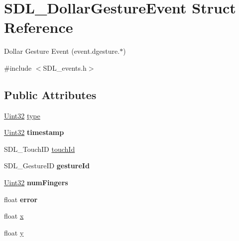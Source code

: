 \hypertarget{struct_s_d_l___dollar_gesture_event}{}\section{S\+D\+L\+\_\+\+Dollar\+Gesture\+Event Struct Reference}
\label{struct_s_d_l___dollar_gesture_event}


Dollar Gesture Event (event.\+dgesture.$\ast$)  




{\ttfamily \#include $<$S\+D\+L\+\_\+events.\+h$>$}

\subsection*{Public Attributes}
\begin{DoxyCompactItemize}
\item 
\hyperlink{_s_d_l__stdinc_8h_add440eff171ea5f55cb00c4a9ab8672d}{Uint32} \hyperlink{struct_s_d_l___dollar_gesture_event_ac7f6948754a1b2eb36edde043bf75ce9}{type}
\item 
\mbox{\label{struct_s_d_l___dollar_gesture_event_a3bccd8ebdf30b79c0f4074f6471ec583}} 
\hyperlink{_s_d_l__stdinc_8h_add440eff171ea5f55cb00c4a9ab8672d}{Uint32} {\bfseries timestamp}
\item 
S\+D\+L\+\_\+\+Touch\+ID \hyperlink{struct_s_d_l___dollar_gesture_event_a40402f6911ed0dba48e6b23aa02bd83d}{touch\+Id}
\item 
\mbox{\label{struct_s_d_l___dollar_gesture_event_a68968438eae9e58208b14e8c954dec31}} 
S\+D\+L\+\_\+\+Gesture\+ID {\bfseries gesture\+Id}
\item 
\mbox{\label{struct_s_d_l___dollar_gesture_event_a14160d8bad8569f53dd18ed8f64d253f}} 
\hyperlink{_s_d_l__stdinc_8h_add440eff171ea5f55cb00c4a9ab8672d}{Uint32} {\bfseries num\+Fingers}
\item 
\mbox{\label{struct_s_d_l___dollar_gesture_event_a30aaa8fe0df93615e6692aa20e9c13eb}} 
float {\bfseries error}
\item 
float \hyperlink{struct_s_d_l___dollar_gesture_event_a9888449bd8842ed96494b4db16a6097b}{x}
\item 
float \hyperlink{struct_s_d_l___dollar_gesture_event_a293b2303acc1cfc63c167c5525e6eab5}{y}
\end{DoxyCompactItemize}


